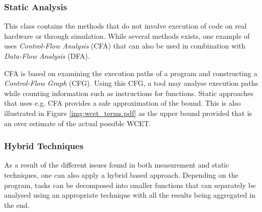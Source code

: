 \subsubsection{Static Analysis}
This class contains the methods that do not involve execution of code on real hardware or through simulation. While several methods exists, one example of uses \textit{Control-Flow Analysis} (CFA) that can also be used in combination with \textit{Data-Flow Analysis} (DFA).

CFA is based on examining the execution paths of a program and constructing a \textit{Control-Flow Graph} (CFG). Using this CFG, a tool may analyse execution paths while counting information such as instructions for functions.
Static approaches that uses e.g. CFA provides a safe approximation of the bound. This is also illustrated in Figure \ref{img:wcet_terms.pdf} as the upper bound provided that is an over estimate of the actual possible WCET. 

\subsubsection{Hybrid Techniques}
As a result of the different issues found in both measurement and static techniques, one can also apply a hybrid based approach. Depending on the program, tasks can be decomposed into smaller functions that can separately be analysed using an appropriate technique with all the results being aggregated in the end.



